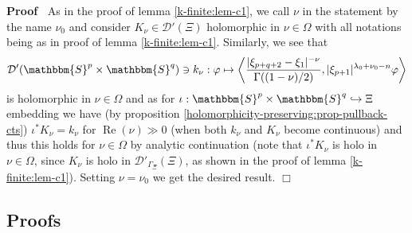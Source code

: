 \documentclass{article}
\newcommand{\nocomma}{}
\newcommand{\tmop}[1]{\ensuremath{\operatorname{#1}}}
\newenvironment{proof}{\noindent\textbf{Proof\ }}{\hspace*{\fill}$\Box$\medskip}
\numberwithin{definition}{section}
\numberwithin{lemma}{section}
\numberwithin{proposition}{section}
{\theorembodyfont{\rmfamily}\newtheorem{remark}{Remark}
\numberwithin{remark}{section}
}
\begin{document}
\begin{proof}
  As in the proof of lemma \ref{k-finite:lem-c1}, we call $\nu$ in the
  statement by the name $\nu_0$ and consider $K_{\nu} \in \mathcal{D}' ( \Xi)$
  holomorphic in $\nu \in \Omega$ with all notations being as in proof of
  lemma \ref{k-finite:lem-c1}. Similarly, we see that
  \[ \mathcal{D}' ( \mathbbm{S}^p \times \mathbbm{S}^q) \ni k_{\nu} : \varphi
     \mapsto \left\langle \frac{| \xi_{p + q + 2} - \xi_1 |^{- \nu}}{\Gamma (
     ( 1 - \nu) / 2)} \nocomma, | \xi_{p + 1} |^{\lambda_0 + \nu_0 - n}
     \varphi \nocomma \right\rangle \]
  is holomorphic in $\nu \in \Omega$ and as for $\iota : \mathbbm{S}^p \times
  \mathbbm{S}^q \hookrightarrow \Xi$ embedding we have (by proposition
  \ref{holomorphicity-preserving:prop-pullback-cts}) $\iota^{\ast} K_{\nu} =
  k_{\nu}$ for $\tmop{Re} ( \nu) \gg 0$ (when both $k_{\nu}$ and $K_{\nu}$
  become continuous) and thus this holds for $\nu \in \Omega$ by analytic
  continuation (note that $\iota^{\ast} K_{\nu}$ is holo in $\nu \in \Omega$,
  since $K_{\nu}$ is holo in $\mathcal{D}'_{\Gamma_{\Xi}} ( \Xi)$, as shown in
  the proof of lemma \ref{k-finite:lem-c1}). Setting $\nu = \nu_0$ we get the
  desired result.
\end{proof}

\subsection{Proofs}
\end{document}
